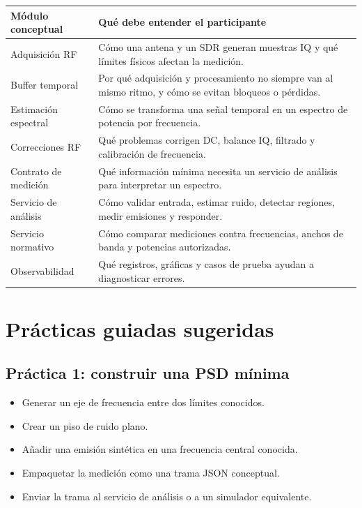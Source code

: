 \documentclass[11pt,a4paper]{article}
\begin{document}
\begin{longtable}{|p{}|p{}|}
\hline
\textbf{Módulo conceptual} & \textbf{Qué debe entender el participante} \\
\hline
\endhead

Adquisición RF & Cómo una antena y un SDR generan muestras IQ y qué límites físicos afectan la medición. \\
\hline
Buffer temporal & Por qué adquisición y procesamiento no siempre van al mismo ritmo, y cómo se evitan bloqueos o pérdidas. \\
\hline
Estimación espectral & Cómo se transforma una señal temporal en un espectro de potencia por frecuencia. \\
\hline
Correcciones RF & Qué problemas corrigen DC, balance IQ, filtrado y calibración de frecuencia. \\
\hline
Contrato de medición & Qué información mínima necesita un servicio de análisis para interpretar un espectro. \\
\hline
Servicio de análisis & Cómo validar entrada, estimar ruido, detectar regiones, medir emisiones y responder. \\
\hline
Servicio normativo & Cómo comparar mediciones contra frecuencias, anchos de banda y potencias autorizadas. \\
\hline
Observabilidad & Qué registros, gráficas y casos de prueba ayudan a diagnosticar errores. \\
\hline
\end{longtable}

\section*{Prácticas guiadas sugeridas}

\subsection*{Práctica 1: construir una PSD mínima}

\begin{itemize}
  \item Generar un eje de frecuencia entre dos límites conocidos.
  \item Crear un piso de ruido plano.
  \item Añadir una emisión sintética en una frecuencia central conocida.
  \item Empaquetar la medición como una trama JSON conceptual.
  \item Enviar la trama al servicio de análisis o a un simulador equivalente.
\end{itemize}
\end{document}
